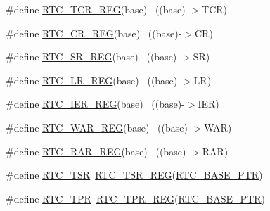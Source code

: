 \begin{DoxyCompactItemize}
\item 
\#define \hyperlink{group___r_t_c___register___accessor___macros_ga0ffe9bb5a8168f247f3aac5de0d59080}{R\+T\+C\+\_\+\+T\+C\+R\+\_\+\+R\+EG}(base)                                            ~((base)-\/$>$T\+CR)
\item 
\#define \hyperlink{group___r_t_c___register___accessor___macros_ga478ae857b195216a8eff27d2fdb74ffd}{R\+T\+C\+\_\+\+C\+R\+\_\+\+R\+EG}(base)                                              ~((base)-\/$>$CR)
\item 
\#define \hyperlink{group___r_t_c___register___accessor___macros_ga3f1d213cb9eafd0e56eacd7f40ee8350}{R\+T\+C\+\_\+\+S\+R\+\_\+\+R\+EG}(base)                                              ~((base)-\/$>$SR)
\item 
\#define \hyperlink{group___r_t_c___register___accessor___macros_gaecf5282b232b87123b993ec1ec9bd2a5}{R\+T\+C\+\_\+\+L\+R\+\_\+\+R\+EG}(base)                                              ~((base)-\/$>$LR)
\item 
\#define \hyperlink{group___r_t_c___register___accessor___macros_ga967d371e055b3013c0f94830a357c19d}{R\+T\+C\+\_\+\+I\+E\+R\+\_\+\+R\+EG}(base)                                            ~((base)-\/$>$I\+ER)
\item 
\#define \hyperlink{group___r_t_c___register___accessor___macros_ga2c4d995d9d6c4857f7035982070319b8}{R\+T\+C\+\_\+\+W\+A\+R\+\_\+\+R\+EG}(base)                                            ~((base)-\/$>$W\+AR)
\item 
\#define \hyperlink{group___r_t_c___register___accessor___macros_ga56c0c73ad611109b3e53f53808092bd6}{R\+T\+C\+\_\+\+R\+A\+R\+\_\+\+R\+EG}(base)                                            ~((base)-\/$>$R\+AR)
\item 
\#define \hyperlink{group___r_t_c___register___accessor___macros_gac34515e965b8b5efb13b40d7928c15a7}{R\+T\+C\+\_\+\+T\+SR}~\hyperlink{group___r_t_c___register___accessor___macros_ga09970f896ffee07c3a05b92951184ffa}{R\+T\+C\+\_\+\+T\+S\+R\+\_\+\+R\+EG}(\hyperlink{group___r_t_c___peripheral_ga6455e2b767b4b224b4f00b50e87a2441}{R\+T\+C\+\_\+\+B\+A\+S\+E\+\_\+\+P\+TR})
\item 
\#define \hyperlink{group___r_t_c___register___accessor___macros_ga4fa174e14f5fc63a79a5553ae101dd66}{R\+T\+C\+\_\+\+T\+PR}~\hyperlink{group___r_t_c___register___accessor___macros_ga27c10c8200591617cc2855238c16c3f1}{R\+T\+C\+\_\+\+T\+P\+R\+\_\+\+R\+EG}(\hyperlink{group___r_t_c___peripheral_ga6455e2b767b4b224b4f00b50e87a2441}{R\+T\+C\+\_\+\+B\+A\+S\+E\+\_\+\+P\+TR})

\end{DoxyCompactItemize}
